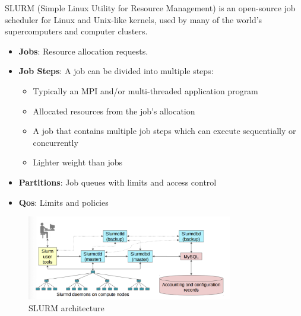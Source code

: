 \begin{definitionblock}[SLURM]
    SLURM (Simple Linux Utility for Resource Management) is an open-source job scheduler for Linux and Unix-like kernels, used by many of the world's supercomputers and computer clusters.
\end{definitionblock}

\begin{itemize}
    \item \textbf{Jobs}: Resource allocation requests.
    \item \textbf{Job Steps}: A job can be divided into multiple steps:
    \begin{itemize}
        \item Typically an MPI and/or multi-threaded application program
        \item Allocated resources from the job's allocation 
        \item A job that contains multiple job steps which can execute sequentially or concurrently
        \item Lighter weight than jobs 
    \end{itemize}
    \item \textbf{Partitions}: Job queues with limits and access control 
    \item \textbf{Qos}: Limits and policies
\end{itemize}

\begin{figure}
    \centering
    \includegraphics[width=0.8\textwidth]{assets/fig16.png}
    \caption{SLURM architecture}
    \label{fig:slurm}
\end{figure}

